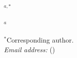 \begin{titlepage}
\thispagestyle{empty}

\begin{center}

	{\Huge \PaperTitle \par}

	\vspace{1.5em}

	{\large \PaperAuthor$^{a,\ast}$ \par}

	\vspace{0.5em}

	{\normalsize $^{a}$\PaperAfiliation \par}

	\vspace{2em}

	{\normalsize
		$^\ast$Corresponding author. \\
		\textit{Email address:} \texttt{\PaperEmail} (\PaperAuthor)
		\par}

\end{center}

\end{titlepage}
